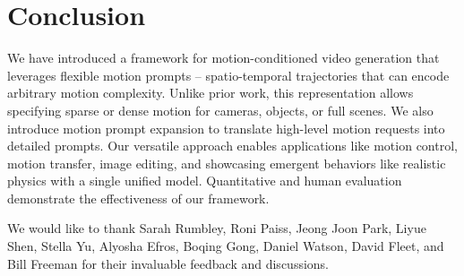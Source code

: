 \section{Conclusion}


We have introduced a framework for motion-conditioned video generation that leverages flexible motion prompts -- spatio-temporal trajectories that can encode arbitrary motion complexity. Unlike prior work, this representation allows specifying sparse or dense motion for cameras, objects, or full scenes. We also introduce motion prompt expansion to translate high-level motion requests into detailed prompts. Our versatile approach enables applications like motion control, motion transfer, image editing, and showcasing emergent behaviors like realistic physics with a single unified model. Quantitative and human evaluation demonstrate the effectiveness of our framework.


 We would like to thank Sarah Rumbley, Roni Paiss, Jeong Joon Park, Liyue Shen, Stella Yu, Alyosha Efros, Boqing Gong, Daniel Watson, David Fleet, and Bill Freeman for their invaluable feedback and discussions.
